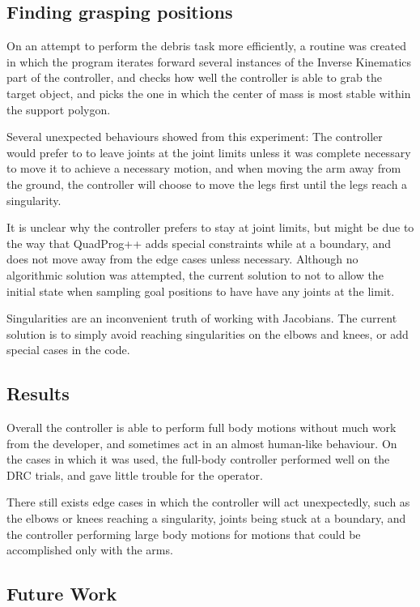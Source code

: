 \documentclass[12pt]{report}
\begin{document}
\subsection{Finding grasping positions}
On an attempt to perform the debris task more efficiently, a routine was created in which the program iterates forward several instances of the Inverse Kinematics part of the controller, and checks how well the controller is able to grab the target object, and picks the one in which the center of mass is most stable within the support polygon.

Several unexpected behaviours showed from this experiment: The controller would prefer to to leave joints at the joint limits unless it was complete necessary to move it to achieve a necessary motion, and when moving the arm away from the ground, the controller will choose to move the legs first until the legs reach a singularity. 

It is unclear why the controller prefers to stay at joint limits, but might be due to the way that QuadProg++ adds special constraints while at a boundary, and does not move away from the edge cases unless necessary. Although no algorithmic solution was attempted, the current solution to not to allow the initial state when sampling goal positions to have  have any joints at the limit.

Singularities are an inconvenient truth of working with Jacobians. The current solution is to simply avoid reaching singularities on the elbows and knees, or add special cases in the code. \cite{eric_thesis}


\subsection{Results}
Overall the controller is able to perform full body motions without much work from the developer, and sometimes act in an almost human-like behaviour. On the cases in which it was used, the full-body controller performed well on the DRC trials, and gave little trouble for the operator. 

There still exists edge cases in which the controller will act unexpectedly, such as the elbows or knees reaching a singularity, joints being stuck at a boundary, and the controller performing large body motions for motions that could be accomplished only with the arms. 

\subsection{Future Work}
\end{document}
